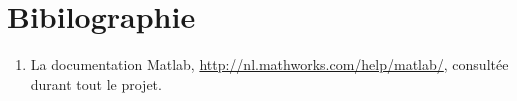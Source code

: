 \section*{Bibilographie}
\begin{enumerate}
\item La documentation Matlab, \url{http://nl.mathworks.com/help/matlab/}, consultée durant tout le projet.
\end{enumerate}